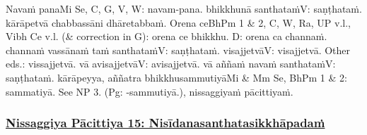 Navaṁ pana\makeatletter\hyperlink{endnote-appendix}\makeatother Mi Se, C, G, V, W: navam-pana. bhikkhunā santhataṁ\makeatletter\hyperlink{endnote-appendix}\makeatother V: saṇṭhataṁ. kārāpetvā chabbassāni dhāretabbaṁ. Orena ce\makeatletter\hyperlink{endnote-appendix}\makeatother BhPm 1 & 2, C, W, Ra, UP v.l., Vibh Ce v.l. (& correction in G): orena ce bhikkhu. D: orena ca channaṁ. channaṁ vassānaṁ taṁ santhataṁ\makeatletter\hyperlink{endnote-appendix}\makeatother V: saṇṭhataṁ. visajjetvā\makeatletter\hyperlink{endnote-appendix}\makeatother V: visajjetvā. Other eds.: vissajjetvā. vā avisajjetvā\makeatletter\hyperlink{endnote-appendix}\makeatother V: avisajjetvā. vā aññaṁ navaṁ santhataṁ\makeatletter\hyperlink{endnote-appendix}\makeatother V: saṇṭhataṁ. kārāpeyya, aññatra bhikkhusammutiyā\makeatletter\hyperlink{endnote-appendix}\makeatother Mi & Mm Se, BhPm 1 & 2: sammatiyā. See NP 3. (Pg: -sammutiyā.), nissaggiyaṁ pācittiyaṁ.



\subsubsection*{\hyperref[forf-exp15]{Nissaggiya Pācittiya 15: Nisīdanasanthatasikkhāpadaṁ}}
\label{np15}

